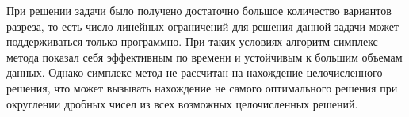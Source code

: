 \documentclass[../body.tex]{subfiles}
\begin{document}
При решении задачи было получено достаточно большое количество вариантов разреза, то есть число линейных ограничений для решения данной задачи может поддерживаться только программно. При таких условиях алгоритм симплекс-метода показал себя эффективным по времени и устойчивым к большим объемам данных. Однако симплекс-метод не рассчитан на нахождение целочисленного решения, что может вызывать нахождение не самого оптимального решения при округлении дробных чисел из всех возможных целочисленных решений.
\end{document}
